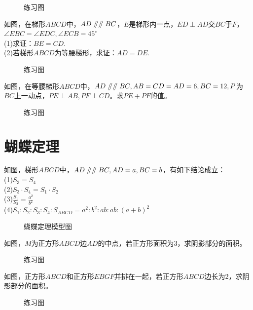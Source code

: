 \begin{figure}[H]
    \centering
    \resizebox{4cm}{!}{}
    \caption{练习图}
\end{figure}
\begin{problem}
如图，在梯形$ABCD$中，$AD\mathrel{/\mkern-5mu/}\mathrel{/\mkern-5mu/} BC$，$E$是梯形内一点，$ED\perp AD$交$BC$于$F$，$\angle EBC=\angle EDC,\angle ECB=45^\circ$ \\
(1)求证：$BE=CD$.\\
(2)若梯形$ABCD$为等腰梯形，求证：$AD=DE$. \\
\end{problem}
\begin{figure}[H]
    \centering
    \resizebox{4cm}{!}{}
    \caption{练习图}
\end{figure}
\begin{problem}
如图，在等腰梯形$ABCD$中，$AD\mathrel{/\mkern-5mu/}\mathrel{/\mkern-5mu/} BC,AB=CD=AD=6,BC=12,P$为$BC$上一动点，$PE\perp AB,PF\perp CD$。求$PE+PF$的值。
\end{problem}
\begin{figure}[H]
    \centering
    \resizebox{4cm}{!}{}
    \caption{练习图}
\end{figure}
\clearpage
\section{蝴蝶定理}
\begin{definition}
    如图，梯形$ABCD$中，$AD\mathrel{/\mkern-5mu/}\mathrel{/\mkern-5mu/} BC,AD=a,BC=b$，有如下结论成立：\\
    (1)$S_3=S_4$ \\
    (2)$S_3·S_4=S_1·S_2$ \\
    (3)$\frac{S_1}{S_2}=\frac{a^2}{b^2}$ \\
    (4)$S_1:S_2:S_3:S_4:S_{ABCD}=a^2:b^2:ab:ab:(a+b)^2$
\end{definition}
\begin{figure}[H]
    \centering
    \resizebox{4cm}{!}{}
    \caption{蝴蝶定理模型图}
\end{figure}
\begin{problem}
如图，$M$为正方形$ABCD$边$AD$的中点，若正方形面积为3，求阴影部分的面积。
\end{problem}
\begin{figure}[H]
    \centering
    \resizebox{4cm}{!}{}
    \caption{练习图}
\end{figure}
\begin{problem}
如图，正方形$ABCD$和正方形$EBGF$并排在一起，若正方形$ABCD$边长为2，求阴影部分的面积。
\end{problem}
\begin{figure}[H]
    \centering
    \resizebox{4cm}{!}{}
    \caption{练习图}
\end{figure}
\clearpage
